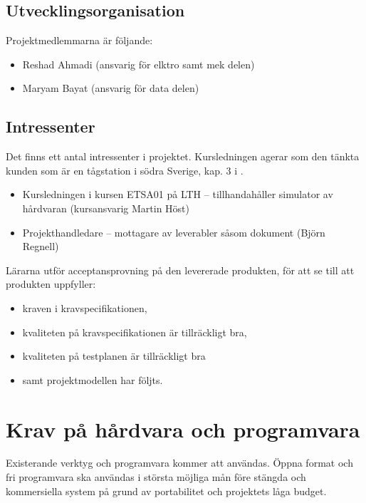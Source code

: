 \documentclass[a4paper]{article}
\begin{document}
\subsection{Utvecklingsorganisation} %
Projektmedlemmarna är följande:

\begin{itemize}
\item Reshad Ahmadi (ansvarig för elktro samt mek delen)
\item Maryam Bayat (ansvarig för data delen)

\end{itemize}


\subsection{Intressenter} %
Det finns ett antal intressenter i projektet. Kursledningen agerar som den tänkta kunden som är en tågstation i södra Sverige, kap. 3 i \cite{engproc}.

\begin{itemize}
\item Kursledningen i kursen ETSA01 på LTH -- tillhandahåller simulator av hårdvaran (kursansvarig Martin Höst)
\item Projekthandledare -- mottagare av leverabler såsom dokument (Björn Regnell)
\end{itemize}

Lärarna utför acceptansprovning på den levererade produkten, för att se till att produkten uppfyller:

\begin{itemize}
\item kraven i kravspecifikationen,
\item kvaliteten på kravspecifikationen är tillräckligt bra,
\item kvaliteten på testplanen är tillräckligt bra
\item samt projektmodellen har följts.
\end{itemize}

\section{Krav på hårdvara och programvara} %
Existerande verktyg och programvara kommer att användas. Öppna format och fri programvara ska användas i största möjliga mån före stängda och kommersiella system på grund av portabilitet och projektets låga budget.
\end{document}
